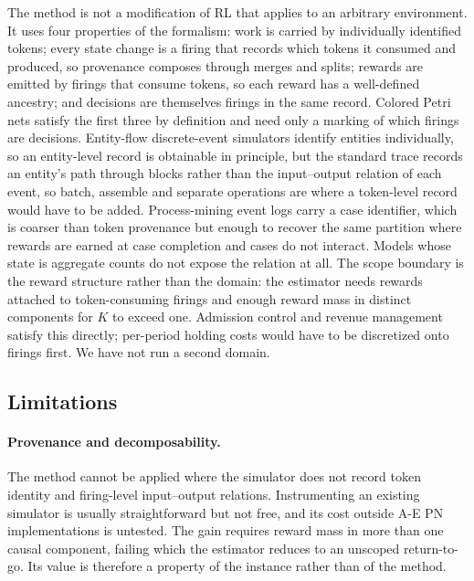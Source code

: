 \documentclass[review,authoryear,3p,times]{elsarticle}
\begin{document}
The method is not a modification of RL that applies to an arbitrary
environment. It uses four properties of the formalism: work is carried by
individually identified tokens; every state change is a firing that records
which tokens it consumed and produced, so provenance composes through merges
and splits; rewards are emitted by firings that consume tokens, so each reward
has a well-defined ancestry; and decisions are themselves firings in the same
record. Colored Petri nets \citep{cpn_jensen} satisfy the first three by
definition and need only a marking of which firings are decisions. Entity-flow
discrete-event simulators identify entities individually, so an entity-level
record is obtainable in principle, but the standard trace records an entity's
path through blocks rather than the input--output relation of each event, so
batch, assemble and separate operations are where a token-level record would
have to be added. Process-mining event logs carry a case identifier, which is
coarser than token provenance but enough to recover the same partition where
rewards are earned at case completion and cases do not interact. Models whose
state is aggregate counts do not expose the relation at all. The scope
boundary is the reward structure rather than the domain: the estimator needs
rewards attached to token-consuming firings and enough reward mass in distinct
components for $K$ to exceed one. Admission control and revenue management
satisfy this directly; per-period holding costs would have to be discretized
onto firings first. We have not run a second domain.

\subsection{Limitations}
\label{sec:limitations}

\paragraph{Provenance and decomposability.} The method cannot be applied where
the simulator does not record token identity and firing-level input--output
relations. Instrumenting an existing simulator is usually straightforward but
not free, and its cost outside A-E PN implementations is untested. The gain
requires reward mass in more than one causal component, failing which the
estimator reduces to an unscoped return-to-go. Its value is therefore a
property of the instance rather than of the method.
\end{document}
